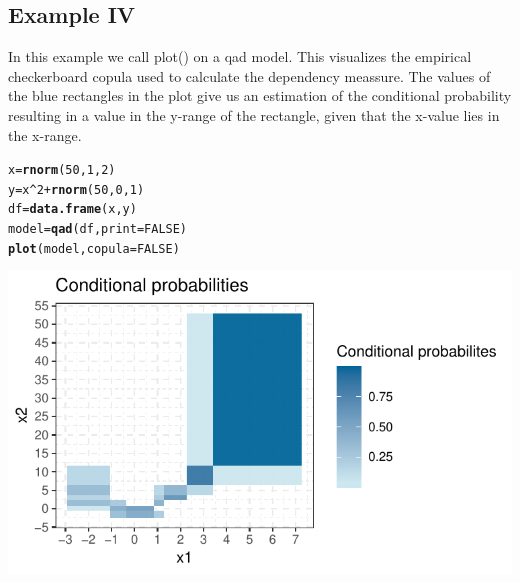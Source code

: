 \documentclass{scrartcl}\usepackage[]{graphicx}\usepackage[]{color}
\makeatletter
\def\maxwidth{ %
  \ifdim\Gin@nat@width>\linewidth
    \linewidth
  \else
    \Gin@nat@width
  \fi
}
\newcommand{\hlnum}[1]{\textcolor[rgb]{0.686,0.059,0.569}{#1}}%
\newcommand{\hlopt}[1]{\textcolor[rgb]{0,0,0}{#1}}%
\newcommand{\hlstd}[1]{\textcolor[rgb]{0.345,0.345,0.345}{#1}}%
\newcommand{\hlkwb}[1]{\textcolor[rgb]{0.69,0.353,0.396}{#1}}%
\newcommand{\hlkwc}[1]{\textcolor[rgb]{0.333,0.667,0.333}{#1}}%
\newcommand{\hlkwd}[1]{\textcolor[rgb]{0.737,0.353,0.396}{\textbf{#1}}}%
\newenvironment{kframe}{%
 \def\at@end@of@kframe{}%
 \ifinner\ifhmode%
  \def\at@end@of@kframe{\end{minipage}}%
  \begin{minipage}{\columnwidth}%
 \fi\fi%
 \def\FrameCommand##1{\hskip\@totalleftmargin \hskip-\fboxsep
 \colorbox{shadecolor}{##1}\hskip-\fboxsep
     \hskip-\linewidth \hskip-\@totalleftmargin \hskip\columnwidth}%
 \MakeFramed {\advance\hsize-\width
   \@totalleftmargin\z@ \linewidth\hsize
   \@setminipage}}%
 {\par\unskip\endMakeFramed%
 \at@end@of@kframe}
\newenvironment{knitrout}{}{} %
\makeatother
\begin{document}
\subsection{Example IV}
In this example we call plot() on a qad model. This visualizes the empirical checkerboard copula used to calculate the dependency meassure. The values of the blue rectangles in the plot give us an estimation of the conditional probability resulting in a value in the y-range of the rectangle, given that the x-value lies in the x-range.

\begin{knitrout}
\color{fgcolor}\begin{kframe}
\begin{alltt}
\hlstd{x} \hlkwb{=} \hlkwd{rnorm}\hlstd{(}\hlnum{50}\hlstd{,}\hlnum{1}\hlstd{,}\hlnum{2}\hlstd{)}
\hlstd{y} \hlkwb{=} \hlstd{x}\hlopt{^}\hlnum{2} \hlopt{+} \hlkwd{rnorm}\hlstd{(}\hlnum{50}\hlstd{,}\hlnum{0}\hlstd{,}\hlnum{1}\hlstd{)}
\hlstd{df} \hlkwb{=} \hlkwd{data.frame}\hlstd{(x,y)}
\hlstd{model} \hlkwb{=} \hlkwd{qad}\hlstd{(df,}\hlkwc{print}\hlstd{=}\hlnum{FALSE}\hlstd{)}
\hlkwd{plot}\hlstd{(model,} \hlkwc{copula} \hlstd{=} \hlnum{FALSE}\hlstd{)}
\end{alltt}
\end{kframe}
\includegraphics[width=\maxwidth]{figure/unnamed-chunk-8-1} 

\end{knitrout}
\end{document}
